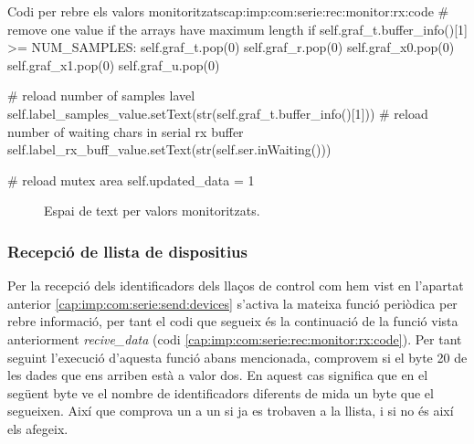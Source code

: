 \begin{code_python}{Codi per rebre els valors monitoritzats}{cap:imp:com:serie:rec:monitor:rx:code}
            # remove one value if the arrays have maximum length
            if self.graf_t.buffer_info()[1] >= NUM_SAMPLES:
                self.graf_t.pop(0)
                self.graf_r.pop(0)
                self.graf_x0.pop(0)
                self.graf_x1.pop(0)
                self.graf_u.pop(0)
                  
            # reload number of samples lavel
            self.label_samples_value.setText(str(self.graf_t.buffer_info()[1]))
            # reload number of waiting chars in serial rx buffer
            self.label_rx_buff_value.setText(str(self.ser.inWaiting()))

            # reload mutex area
            self.updated_data = 1
\end{code_python}

\begin{figure}[ht!]
	

	\caption{Espai de text per valors monitoritzats.}
    \label{fig:comparacio:valors}
\end{figure}

\FloatBarrier

\subsubsection{Recepció de llista de dispositius}\label{cap:imp:com:serie:rec:devices}

Per la recepció dels identificadors dels llaços de control com hem vist en l'apartat anterior \ref{cap:imp:com:serie:send:devices} s'activa la mateixa funció periòdica per rebre informació, per tant el codi que segueix és la continuació de la funció vista anteriorment \emph{recive\_data} (codi \ref{cap:imp:com:serie:rec:monitor:rx:code}).
Per tant seguint l'execució d'aquesta funció abans mencionada, comprovem si el byte 20 de les dades que ens arriben està a valor dos. En aquest cas significa que en el següent byte ve el nombre de identificadors diferents de mida un byte que el segueixen. Així que comprova un a un si ja es trobaven a la llista, i si no és així els afegeix.

